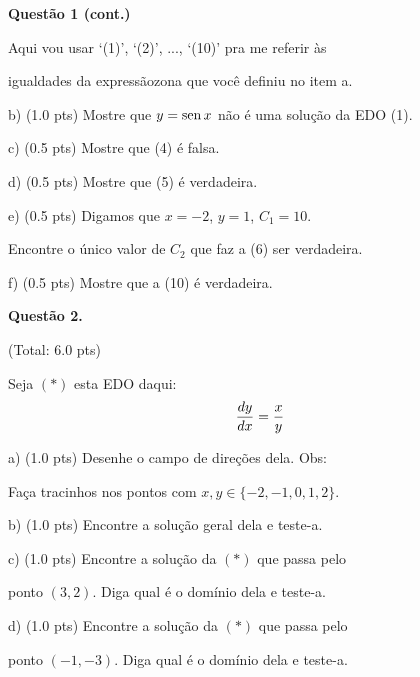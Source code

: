 \documentclass[oneside,12pt]{article}
\begin{document}
{\bf Questão 1 (cont.)}

Aqui vou usar `(1)', `(2)', ..., `(10)' pra me referir às

igualdades da expressãozona  que você definiu no item a.

\msk

b) \B(1.0 pts) Mostre que $y=\operatorname{sen} x$ não é uma solução da EDO
(1).

\ssk

c) \B(0.5 pts) Mostre que (4) é falsa.

\ssk

d) \B(0.5 pts) Mostre que (5) é verdadeira.

\ssk

e) \B(0.5 pts) Digamos que $x=-2$, $y=1$, $C_1=10$.

Encontre o único valor de $C_2$ que faz a (6) ser verdadeira.

\ssk

f) \B(0.5 pts) Mostre que a (10) é verdadeira.

\newpage


{\bf Questão 2.}

\T(Total: 6.0 pts)

\msk

Seja $(*)$ esta EDO daqui:
%
$$\displaystyle \frac{dy}{dx} = \frac{x}{y}$$



a) \B(1.0 pts) Desenhe o campo de direções dela. Obs:

Faça tracinhos nos pontos com $x,y∈\{-2,-1,0,1,2\}$.

\ssk

b) \B(1.0 pts) Encontre a solução geral dela e teste-a.

\ssk

c) \B(1.0 pts) Encontre a solução da $(*)$ que passa pelo

ponto $(3,2)$. Diga qual é o domínio dela e teste-a.

\ssk

d) \B(1.0 pts) Encontre a solução da $(*)$ que passa pelo

ponto $(-1,-3)$. Diga qual é o domínio dela e teste-a.


\newpage

\end{document}
